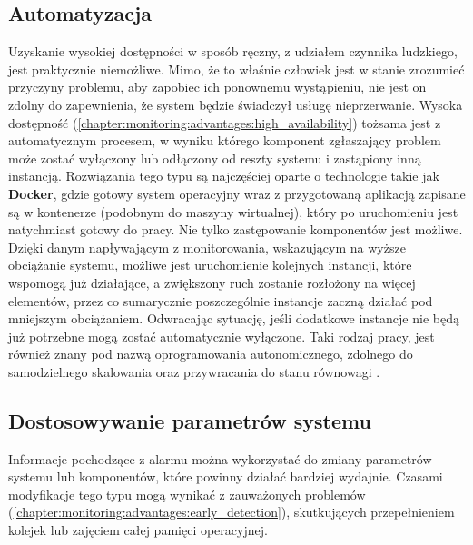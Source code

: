     \subsection{Automatyzacja}
    Uzyskanie wysokiej dostępności w sposób ręczny, z udziałem czynnika ludzkiego, jest praktycznie niemożliwe.
    Mimo, że to właśnie człowiek jest w stanie zrozumieć przyczyny problemu, aby zapobiec ich ponownemu wystąpieniu, 
    nie jest on zdolny do zapewnienia, że system będzie świadczył usługę nieprzerwanie. Wysoka dostępność (\ref{chapter:monitoring:advantages:high_availability}) tożsama jest z automatycznym procesem, w wyniku którego
    komponent zgłaszający problem może zostać wyłączony lub odłączony od reszty systemu i zastąpiony inną instancją.
    Rozwiązania tego typu są najczęściej oparte o technologie takie jak \textbf{Docker}, gdzie gotowy system
    operacyjny wraz z przygotowaną aplikacją zapisane są w kontenerze (podobnym do maszyny wirtualnej), który po 
    uruchomieniu jest natychmiast gotowy do pracy. Nie tylko zastępowanie komponentów jest możliwe. Dzięki
    danym napływającym z monitorowania, wskazującym na wyższe obciążanie systemu, możliwe jest uruchomienie
    kolejnych instancji, które wspomogą już działające, a zwiększony ruch zostanie rozłożony na więcej elementów,
    przez co sumarycznie poszczególnie instancje zaczną działać pod mniejszym obciążaniem. Odwracając sytuację, jeśli
    dodatkowe instancje nie będą już potrzebne mogą zostać automatycznie wyłączone. Taki rodzaj pracy, jest również
    znany pod nazwą oprogramowania autonomicznego, zdolnego do samodzielnego skalowania oraz przywracania do stanu równowagi \cite{monitoring_and_alerting}.
    
    \subsection{Dostosowywanie parametrów systemu}
    Informacje pochodzące z alarmu można wykorzystać do zmiany parametrów systemu lub komponentów,
    które powinny działać bardziej wydajnie. Czasami modyfikacje tego typu mogą wynikać z zauważonych
    problemów (\ref{chapter:monitoring:advantages:early_detection}), skutkujących przepełnieniem
    kolejek lub zajęciem całej pamięci operacyjnej. 